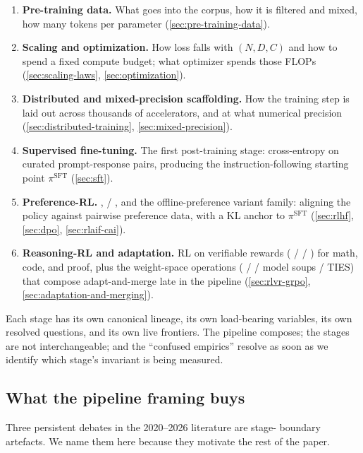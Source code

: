 \begin{enumerate}
\item \textbf{Pre-training data.} What goes into the corpus, how it is
  filtered and mixed, how many tokens per parameter
  (\cref{sec:pre-training-data}).
\item \textbf{Scaling and optimization.} How loss falls with $(N, D, C)$
  and how to spend a fixed compute budget; what optimizer spends those
  FLOPs (\cref{sec:scaling-laws}, \cref{sec:optimization}).
\item \textbf{Distributed and mixed-precision scaffolding.} How the
  training step is laid out across thousands of accelerators, and at
  what numerical precision (\cref{sec:distributed-training},
  \cref{sec:mixed-precision}).
\item \textbf{Supervised fine-tuning.} The first post-training stage:
  cross-entropy on curated prompt-response pairs, producing the
  instruction-following starting point $\pi^{\mathrm{SFT}}$
  (\cref{sec:sft}).
\item \textbf{Preference-RL.} ,  / ,  and
  the offline-preference variant family: aligning the policy against
  pairwise preference data, with a KL anchor to $\pi^{\mathrm{SFT}}$
  (\cref{sec:rlhf}, \cref{sec:dpo}, \cref{sec:rlaif-cai}).
\item \textbf{Reasoning-RL and adaptation.} RL on verifiable rewards
  ( /  / ) for math, code, and proof, plus the weight-space
  operations ( /  / model soups / TIES) that compose
  adapt-and-merge late in the pipeline
  (\cref{sec:rlvr-grpo}, \cref{sec:adaptation-and-merging}).
\end{enumerate}
Each stage has its own canonical lineage, its own load-bearing
variables, its own resolved questions, and its own live frontiers. The
pipeline composes; the stages are not interchangeable; and the
``confused empirics'' resolve as soon as we identify which stage's
invariant is being measured.

\subsection{What the pipeline framing buys}
\label{sec:intro-buy}

Three persistent debates in the 2020--2026 literature are stage-
boundary artefacts. We name them here because they motivate the rest of
the paper.

